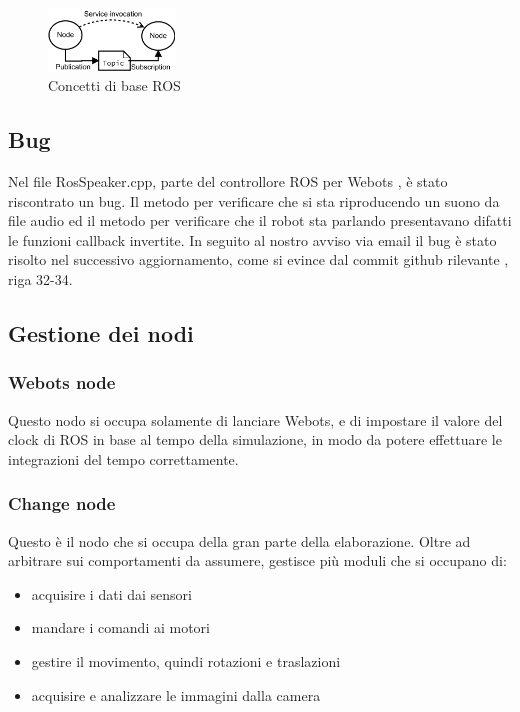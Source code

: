\documentclass[a4paper]{article}
\begin{document}
	\begin{figure}[H]
		\centering
		\includegraphics[width=0.3\textwidth]{./img/ROS_basic_concepts.pdf}
		\caption{Concetti di base ROS}
		\label{fig:ros_concepts}
	\end{figure}
	
	\subsection{Bug}\label{subsec:Bug}
	Nel file RosSpeaker.cpp, parte del controllore ROS per Webots \cite{cyberbotics}, è stato riscontrato un bug. Il metodo per verificare che si sta riproducendo un suono da file audio ed il metodo per verificare che il robot sta parlando presentavano difatti le funzioni callback invertite. In seguito al nostro avviso via email il bug è stato risolto nel successivo aggiornamento, come si evince dal commit github rilevante \cite{rosbug}, riga 32-34.
	
	\subsection{Gestione dei nodi}\label{subsec:Gestione-dei-nodi}
	\subsubsection{Webots node}\label{subsubsec:Webots-node}
	Questo nodo si occupa solamente di lanciare Webots, e di impostare il valore del clock di ROS in base al tempo della simulazione, in modo da potere effettuare le integrazioni del tempo correttamente. 
	\subsubsection{Change node}\label{subsubsec:Change-node}
	Questo è il nodo che si occupa della gran parte della elaborazione. Oltre ad arbitrare sui comportamenti da assumere, gestisce più moduli che si occupano di:
	\begin{itemize}
		\item acquisire i dati dai sensori
		\item mandare i comandi ai motori
		\item gestire il movimento, quindi rotazioni e traslazioni
		\item acquisire e analizzare le immagini dalla camera
	\end{itemize}
\end{document}
